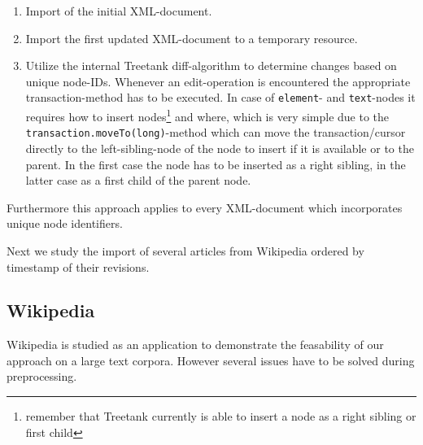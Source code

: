 \begin{enumerate}
\item Import of the initial XML-document.
\item Import the first updated XML-document to a temporary resource.
\item Utilize the internal Treetank diff-algorithm to determine changes based on unique node-IDs. Whenever an edit-operation is encountered the appropriate transaction-method has to be executed. In case of \texttt{element}- and \texttt{text}-nodes it requires how to insert nodes\footnote{remember that Treetank currently is able to insert a node as a right sibling or first child} and where, which is very simple due to the \texttt{transaction.moveTo(long)}-method which can move the transaction/cursor directly to the left-sibling-node of the node to insert if it is available or to the parent. In the first case the node has to be inserted as a right sibling, in the latter case as a first child of the parent node.
\end{enumerate}

Furthermore this approach applies to every XML-document which incorporates unique node identifiers.

Next we study the import of several articles from Wikipedia ordered by timestamp of their revisions. 

\subsection{Wikipedia}
Wikipedia is studied as an application to demonstrate the feasability of our approach on a large text corpora. However several issues have to be solved during preprocessing.

